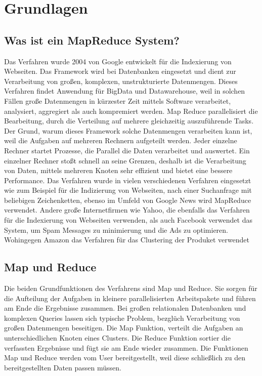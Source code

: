\documentclass[a4paper,12pt]{article}
\begin{document}
\section{Grundlagen}

\subsection{Was ist ein MapReduce System?}
Das Verfahren wurde 2004 von Google entwickelt für die Indexierung von Webseiten. Das Framework wird bei Datenbanken eingesetzt und dient zur Verarbeitung von großen, komplexen, unstrukturierte Datenmengen.
Dieses Verfahren findet Anwendung für BigData und Datawarehouse, weil in solchen Fällen große Datenmengen in kürzester Zeit mittels Software verarbeitet, analysiert, aggregiert als auch kompremiert werden. 
Map Reduce parallelisiert die Bearbeitung, durch die Verteilung auf mehrere gleichzeitig auszuführende Tasks. Der Grund, warum dieses Framework solche Datenmengen verarbeiten kann ist, weil die Aufgaben auf mehreren Rechnern aufgeteilt werden. Jeder einzelne Rechner startet Prozesse, die Parallel die Daten verarbeitet und auswertet.
Ein einzelner Rechner stoßt schnell an seine Grenzen, deshalb ist die Verarbeitung von Daten, mittels mehreren Knoten sehr effizient und bietet eine bessere Performance.
Das Verfahren wurde in vielen verschiedenen Verfahren eingesetzt wie zum Beispiel für die Indizierung von Webseiten, nach einer Suchanfrage mit beliebigen Zeichenketten, ebenso im Umfeld von Google News wird MapReduce verwendet. Andere große Internetfirmen wie Yahoo, die ebenfalls das Verfahren für die Indexierung von Webseiten verwenden, 
als auch Facebook verwendet das System, um Spam Messages zu minimierung und die Ads zu optimieren. Wohingegen Amazon das Verfahren für das Clustering der Produket verwendet

\subsection{Map und Reduce}
Die beiden Grundfunktionen des Verfahrens sind Map und Reduce. Sie sorgen für die Aufteilung der Aufgaben in kleinere parallelisierten Arbeitspakete und führen am Ende die Ergebnisse zusammen. Bei großen relationalen Datenbanken und komplexen Queries lassen sich typische Problem, bezglüch Verarbeitung von großen Datenmengen beseitigen.
Die Map Funktion, verteilt die Aufgaben an unterschiedlichen Knoten eines Clusters. Die Reduce Funktion sortier die verfassten Ergebnisse und fügt sie am Ende wieder zusammen.
Die Funktionen Map und Reduce werden vom User bereitgestellt, weil diese schließlich zu den bereitgestellten Daten passen müssen.
\cite{mrsystem}
\newpage
\end{document}
